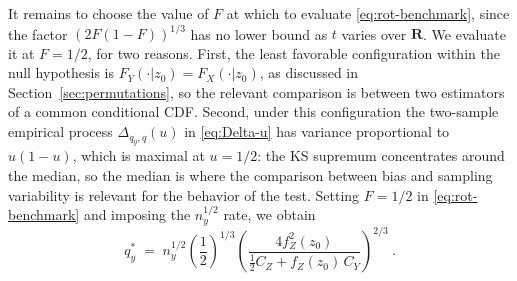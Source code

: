 \documentclass[11pt]{article}
\numberwithin{equation}{section}
\begin{document}
It remains to choose the value of $F$ at which to evaluate \eqref{eq:rot-benchmark}, since the factor $(2F(1-F))^{1/3}$ has no lower bound as $t$ varies over $\mathbf R$. We evaluate it at $F = 1/2$, for two reasons. First, the least favorable configuration within the null hypothesis is $F_Y(\cdot|z_0) = F_X(\cdot|z_0)$, as discussed in Section~\ref{sec:permutations}, so the relevant comparison is between two estimators of a common conditional CDF. Second, under this configuration the two-sample empirical process $\Delta_{q_y,q}(u)$ in \eqref{eq:Delta-u} has variance proportional to $u(1-u)$, which is maximal at $u = 1/2$: the KS supremum concentrates around the median, so the median is where the comparison between bias and sampling variability is relevant for the behavior of the test. Setting $F = 1/2$ in \eqref{eq:rot-benchmark} and imposing the $n_y^{1/2}$ rate, we obtain
\begin{equation}\label{eq:rot-general}
 q_y^* \;=\; n_y^{1/2} \left(\frac{1}{2}\right)^{1/3} \left( \frac{4 f_Z^2(z_0)}{\tfrac{1}{2} C_Z + f_Z(z_0)\, C_Y} \right)^{2/3}~.
\end{equation}
\end{document}
